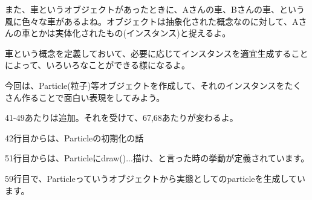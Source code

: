 \documentclass[mingoth,11pt,a4j,uplatex]{jsarticle}
\begin{document}
また、車というオブジェクトがあったときに、Aさんの車、Bさんの車、という風に色々な車があるよね。オブジェクトは抽象化された概念なのに対して、Aさんの車とかは実体化されたもの(インスタンス)と捉えるよ。

車という概念を定義しておいて、必要に応じてインスタンスを適宜生成することによって、いろいろなことができる様になるよ。

今回は、Particle(粒子)等オブジェクトを作成して、それのインスタンスをたくさん作ることで面白い表現をしてみよう。

41-49あたりは追加。それを受けて、67,68あたりが変わるよ。

42行目からは、Particleの初期化の話

51行目からは、Particleにdraw()...描け、と言った時の挙動が定義されています。

59行目で、Particleっていうオブジェクトから実態としてのparticleを生成しています。
\end{document}

